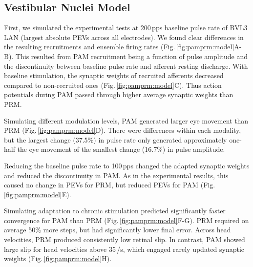 \subsection{Vestibular Nuclei Model}
First, we simulated the experimental tests at 200\,pps baseline pulse rate of BVL3 LAN (largest absolute PEVs across all electrodes). We found clear differences in the resulting recruitments and ensemble firing rates (Fig.\,\ref{fig:pamprm:model}A-B). This resulted from PAM recruitment being a function of pulse amplitude and the discontinuity between baseline pulse rate and afferent resting discharge. With baseline stimulation, the synaptic weights of recruited afferents decreased compared to non-recruited ones (Fig.\,\ref{fig:pamprm:model}C). Thus action potentials during PAM passed through higher average synaptic weights than PRM. 

	Simulating different modulation levels, PAM generated larger eye movement than PRM (Fig.\,\ref{fig:pamprm:model}D). There were differences within each modality, but the largest change (37.5\%) in pulse rate only generated approximately one-half the eye movement of the smallest change (16.7\%) in pulse amplitude.  
	
	Reducing the baseline pulse rate to 100\,pps changed the adapted synaptic weights and reduced the discontinuity in PAM. As in the experimental results, this caused no change in PEVs for PRM, but reduced PEVs for PAM (Fig.\,\ref{fig:pamprm:model}E).
	
Simulating adaptation to chronic stimulation predicted significantly faster convergence for PAM than PRM (Fig.\,\ref{fig:pamprm:model}F-G). PRM required on average 50\% more steps, but had significantly lower final error. Across head velocities, PRM produced consistently low retinal slip. In contrast, PAM showed large slip for head velocities above 35\,\degree /s, which engaged rarely updated synaptic weights (Fig.\,\ref{fig:pamprm:model}H).

